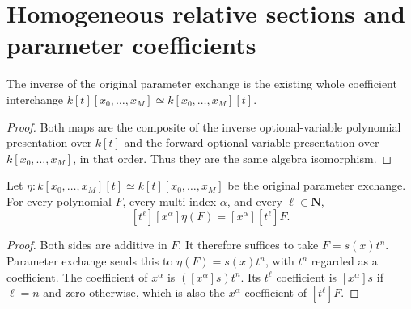 \section{Homogeneous relative sections and parameter coefficients}

\begin{lemma}
\label{lem:c0n-original-parameter-native-swap}
\leanok
The inverse of the original parameter exchange is the existing whole
coefficient interchange
$k[t][x_0,\ldots,x_M]\simeq k[x_0,\ldots,x_M][t]$.
\end{lemma}
\begin{proof}
Both maps are the composite of the inverse optional-variable polynomial
presentation over $k[t]$ and the forward optional-variable presentation
over $k[x_0,\ldots,x_M]$, in that order.  Thus they are the same algebra
isomorphism.
\end{proof}

\begin{lemma}
\label{lem:c0n-original-parameter-coefficients}
\leanok
Let $\eta:k[x_0,\ldots,x_M][t]\simeq k[t][x_0,\ldots,x_M]$
be the original parameter exchange.  For every polynomial $F$, every
multi-index $\alpha$, and every $\ell\in\mathbf N$,
\[
 [t^\ell][x^\alpha]\eta(F)=[x^\alpha][t^\ell]F.
\]
\end{lemma}
\begin{proof}
Both sides are additive in $F$.  It therefore suffices to take
$F=s(x)t^n$.  Parameter exchange sends this to
$\eta(F)=s(x)t^n$, with $t^n$ regarded as a coefficient.
The coefficient of $x^\alpha$ is $([x^\alpha]s)t^n$.
Its $t^\ell$ coefficient is $[x^\alpha]s$ if $\ell=n$ and zero otherwise,
which is also the $x^\alpha$ coefficient of $[t^\ell]F$.
\end{proof}

